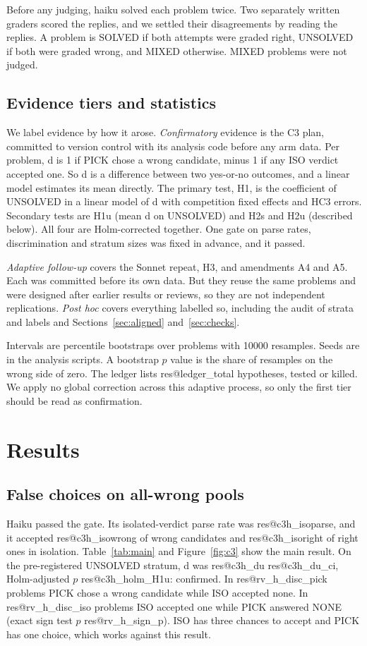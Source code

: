 \documentclass[10pt,twocolumn]{article}
\makeatletter
\newcommand{\res}[1]{\csname res@#1\endcsname}
\makeatother
\begin{document}
Before any judging, haiku solved each problem twice. Two separately written graders scored the replies, and we settled their disagreements by reading the replies. A problem is SOLVED if both attempts were graded right, UNSOLVED if both were graded wrong, and MIXED otherwise. MIXED problems were not judged.

\subsection{Evidence tiers and statistics}
We label evidence by how it arose. \emph{Confirmatory} evidence is the C3 plan, committed to version control with its analysis code before any arm data. Per problem, d is 1 if PICK chose a wrong candidate, minus 1 if any ISO verdict accepted one. So d is a difference between two yes-or-no outcomes, and a linear model estimates its mean directly. The primary test, H1, is the coefficient of UNSOLVED in a linear model of d with competition fixed effects and HC3 errors. Secondary tests are H1u (mean d on UNSOLVED) and H2s and H2u (described below). All four are Holm-corrected together. One gate on parse rates, discrimination and stratum sizes was fixed in advance, and it passed.

\emph{Adaptive follow-up} covers the Sonnet repeat, H3, and amendments A4 and A5. Each was committed before its own data. But they reuse the same problems and were designed after earlier results or reviews, so they are not independent replications. \emph{Post hoc} covers everything labelled so, including the audit of strata and labels and Sections~\ref{sec:aligned} and~\ref{sec:checks}.

Intervals are percentile bootstraps over problems with 10000 resamples. Seeds are in the analysis scripts. A bootstrap $p$ value is the share of resamples on the wrong side of zero. The ledger lists \res{ledger_total} hypotheses, tested or killed. We apply no global correction across this adaptive process, so only the first tier should be read as confirmation.

\section{Results}
\subsection{False choices on all-wrong pools}\label{sec:c3}
Haiku passed the gate. Its isolated-verdict parse rate was \res{c3h_isoparse}, and it accepted \res{c3h_isowrong} of wrong candidates and \res{c3h_isoright} of right ones in isolation. Table~\ref{tab:main} and Figure~\ref{fig:c3} show the main result. On the pre-registered UNSOLVED stratum, d was \res{c3h_du} \res{c3h_du_ci}, Holm-adjusted $p$ \res{c3h_holm_H1u}: confirmed. In \res{rv_h_disc_pick} problems PICK chose a wrong candidate while ISO accepted none. In \res{rv_h_disc_iso} problems ISO accepted one while PICK answered NONE (exact sign test $p$ \res{rv_h_sign_p}). ISO has three chances to accept and PICK has one choice, which works against this result.
\end{document}
